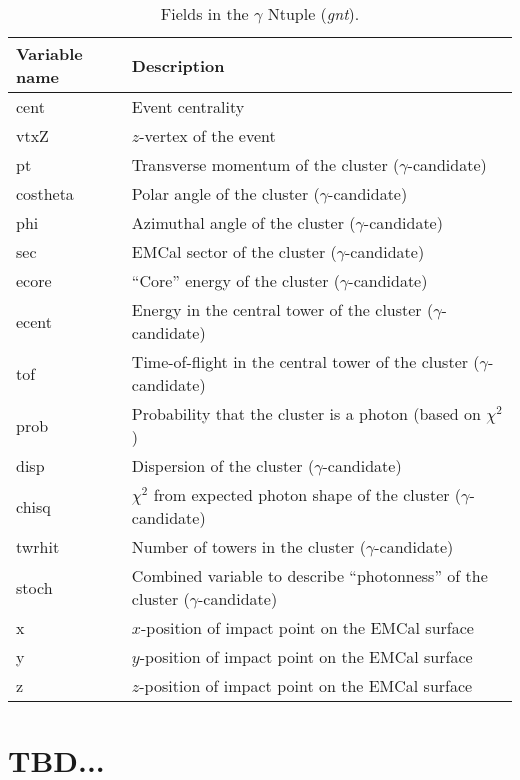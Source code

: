 \documentclass[pdftex,12pt,letter]{article}
\begin{document}
\begin{table}[h]
  \begin{tabular}{|l|l|} \hline
    Variable name & Description \\ \hline
    cent & Event centrality \\
    vtxZ & $z$-vertex of the event \\
    pt   & Transverse momentum of the cluster ($\gamma$-candidate) \\
    costheta & Polar angle of the cluster ($\gamma$-candidate) \\    
    phi & Azimuthal angle of the cluster ($\gamma$-candidate) \\
    sec & EMCal sector of the cluster ($\gamma$-candidate) \\
    ecore & ``Core'' energy of the cluster ($\gamma$-candidate) \\
    ecent & Energy in the central tower of the cluster ($\gamma$-candidate) \\
    tof   & Time-of-flight in the central tower of the cluster ($\gamma$-candidate) \\
    prob & Probability that the cluster is a photon (based on $\chi^2$) \\
    disp & Dispersion of the cluster ($\gamma$-candidate) \\
    chisq & $\chi^2$ from expected photon shape of the cluster ($\gamma$-candidate) \\
    twrhit & Number of towers in the cluster ($\gamma$-candidate) \\
    stoch & Combined variable to describe ``photonness'' of the cluster ($\gamma$-candidate) \\
    x & $x$-position of impact point on the EMCal surface \\
    y & $y$-position of impact point on the EMCal surface \\
    z & $z$-position of impact point on the EMCal surface \\ \hline
  \end{tabular}
  \vspace{0.3cm}
  \caption{Fields in the $\gamma$ Ntuple ({\it gnt}).
}
  \label{tab:gnt}
 \end{table}
\section{TBD...}
\end{document}

